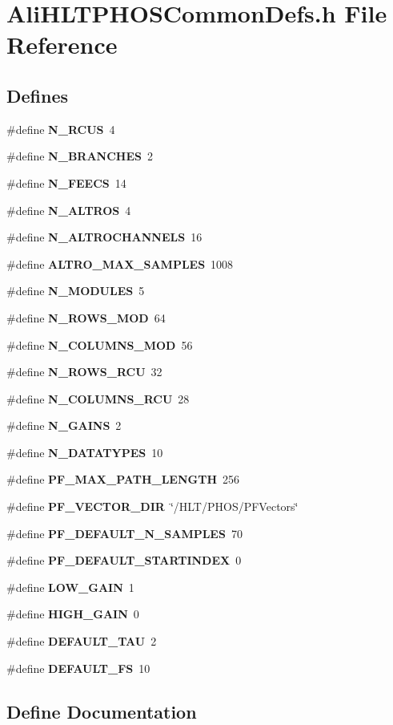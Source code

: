 \section{Ali\-HLTPHOSCommon\-Defs.h File Reference}
\label{AliHLTPHOSCommonDefs_8h}


\subsection*{Defines}
\begin{CompactItemize}
\item 
\#define {\bf N\_\-RCUS}\ 4
\item 
\#define {\bf N\_\-BRANCHES}\ 2
\item 
\#define {\bf N\_\-FEECS}\ 14
\item 
\#define {\bf N\_\-ALTROS}\ 4
\item 
\#define {\bf N\_\-ALTROCHANNELS}\ 16
\item 
\#define {\bf ALTRO\_\-MAX\_\-SAMPLES}\ 1008
\item 
\#define {\bf N\_\-MODULES}\ 5
\item 
\#define {\bf N\_\-ROWS\_\-MOD}\ 64
\item 
\#define {\bf N\_\-COLUMNS\_\-MOD}\ 56
\item 
\#define {\bf N\_\-ROWS\_\-RCU}\ 32
\item 
\#define {\bf N\_\-COLUMNS\_\-RCU}\ 28
\item 
\#define {\bf N\_\-GAINS}\ 2
\item 
\#define {\bf N\_\-DATATYPES}\ 10
\item 
\#define {\bf PF\_\-MAX\_\-PATH\_\-LENGTH}\ 256
\item 
\#define {\bf PF\_\-VECTOR\_\-DIR}\ \char`\"{}/HLT/PHOS/PFVectors\char`\"{}
\item 
\#define {\bf PF\_\-DEFAULT\_\-N\_\-SAMPLES}\ 70
\item 
\#define {\bf PF\_\-DEFAULT\_\-STARTINDEX}\ 0
\item 
\#define {\bf LOW\_\-GAIN}\ 1
\item 
\#define {\bf HIGH\_\-GAIN}\ 0
\item 
\#define {\bf DEFAULT\_\-TAU}\ 2
\item 
\#define {\bf DEFAULT\_\-FS}\ 10
\end{CompactItemize}


\subsection{Define Documentation}
